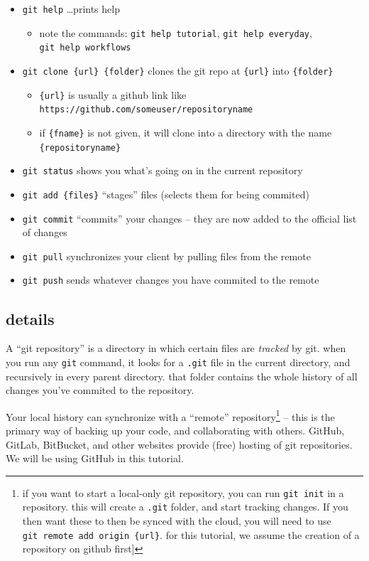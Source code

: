 \documentclass[
]{article}
\providecommand{\tightlist}{%
  \setlength{\itemsep}{0pt}\setlength{\parskip}{0pt}}
\begin{document}
\begin{itemize}
\tightlist
\item
  \texttt{git\ help} \ldots prints help

  \begin{itemize}
  \tightlist
  \item
    note the commands: \texttt{git\ help\ tutorial},
    \texttt{git\ help\ everyday}, \texttt{git\ help\ workflows}
  \end{itemize}
\item
  \texttt{git\ clone\ \{url\}\ \{folder\}} clones the git repo at
  \texttt{\{url\}} into \texttt{\{folder\}}

  \begin{itemize}
  \tightlist
  \item
    \texttt{\{url\}} is usually a github link like
    \texttt{https://github.com/someuser/repositoryname}
  \item
    if \texttt{\{fname\}} is not given, it will clone into a directory
    with the name \texttt{\{repositoryname\}}
  \end{itemize}
\item
  \texttt{git\ status} shows you what's going on in the current
  repository
\item
  \texttt{git\ add\ \{files\}} ``stages'' files (selects them for being
  commited)
\item
  \texttt{git\ commit} ``commits'' your changes -- they are now added to
  the official list of changes
\item
  \texttt{git\ pull} synchronizes your client by pulling files from the
  remote
\item
  \texttt{git\ push} sends whatever changes you have commited to the
  remote
\end{itemize}

\hypertarget{details}{%
\subsection{details}\label{details}}

A ``git repository'' is a directory in which certain files are
\emph{tracked} by git. when you run any \texttt{git} command, it looks
for a \texttt{.git} file in the current directory, and recursively in
every parent directory. that folder contains the whole history of all
changes you've commited to the repository.

Your local history can synchronize with a ``remote''
repository\footnote{if you want to start a local-only git repository,
  you can run \texttt{git\ init} in a repository. this will create a
  \texttt{.git} folder, and start tracking changes. If you then want
  these to then be synced with the cloud, you will need to use
  \texttt{git\ remote\ add\ origin\ \{url\}}. for this tutorial, we
  assume the creation of a repository on github first{]}} -- this is the
primary way of backing up your code, and collaborating with others.
GitHub, GitLab, BitBucket, and other websites provide (free) hosting of
git repositories. We will be using GitHub in this tutorial.
\end{document}
